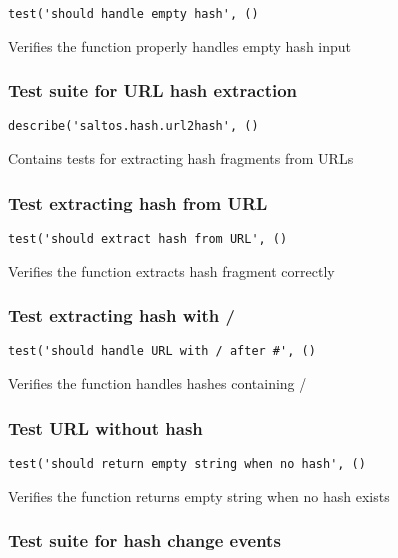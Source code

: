 \documentclass[a4paper]{article}
\begin{document}
\begin{lstlisting}
test('should handle empty hash', ()
\end{lstlisting}

Verifies the function properly handles empty hash input

\hypertarget{toc215}{}
\subsubsection{Test suite for URL hash extraction}

\begin{lstlisting}
describe('saltos.hash.url2hash', ()
\end{lstlisting}

Contains tests for extracting hash fragments from URLs

\hypertarget{toc216}{}
\subsubsection{Test extracting hash from URL}

\begin{lstlisting}
test('should extract hash from URL', ()
\end{lstlisting}

Verifies the function extracts hash fragment correctly

\hypertarget{toc217}{}
\subsubsection{Test extracting hash with /}

\begin{lstlisting}
test('should handle URL with / after #', ()
\end{lstlisting}

Verifies the function handles hashes containing /

\hypertarget{toc218}{}
\subsubsection{Test URL without hash}

\begin{lstlisting}
test('should return empty string when no hash', ()
\end{lstlisting}

Verifies the function returns empty string when no hash exists

\hypertarget{toc219}{}
\subsubsection{Test suite for hash change events}
\end{document}
